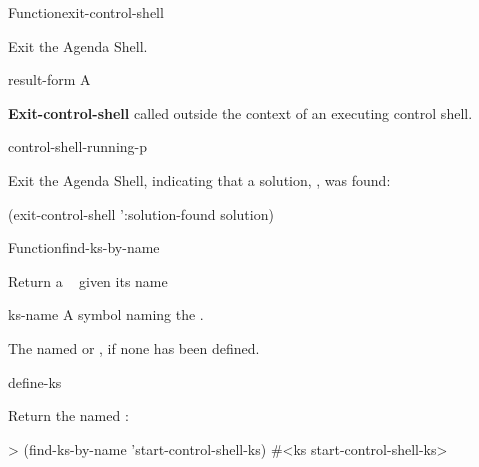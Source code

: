 \documentclass[10pt,twoside,english,pdftex]{article}
\begin{document}
\begin{functiondoc}{Function}{exit-control-shell}{
 \superstar}
%
%
%
%

\fnsyntax

\fnpurpose Exit the Agenda Shell.

\fnpackage {}

\fnmodule {}

\fnargs
\begin{args}{result-form}
 A 
\end{args}

\fnerrors \textbf{Exit-control-shell} called outside the context of an
executing control shell.

\begin{alsos}{control-shell-running-p}
\end{alsos}

\fnexample Exit the Agenda Shell, indicating that a solution, 
, was found:
\begin{example}
  (exit-control-shell ':solution-found solution)
\end{example}

\end{functiondoc}

 
\begin{functiondoc}{Function}{find-ks-by-name}{ 
  \returns{} }
%

\fnsyntax

\fnpurpose Return a ~  given its name

\fnpackage {}

\fnmodule {}

\fnargs
\begin{args}{ks-name}
\arg[ks-name] A symbol naming the .
\end{args}

\fnreturns The   named 
or \nil, if none has been defined.

\begin{alsos}{define-ks}
\also[define-ks]
\also[ks]
\end{alsos}

\fnexample Return the  named :
\begin{example}
> (find-ks-by-name 'start-control-shell-ks)
#<ks start-control-shell-ks>
\end{example}

\end{functiondoc}
\end{document}

